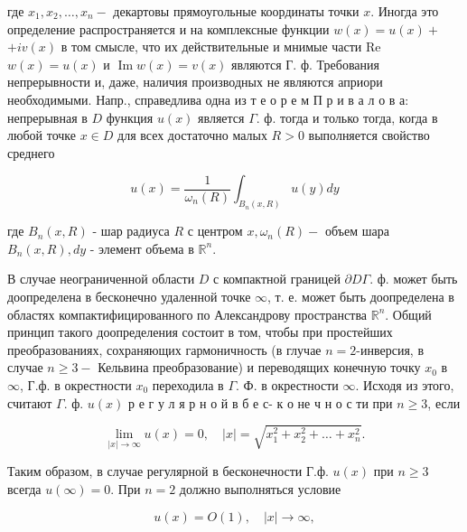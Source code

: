 \documentclass[10pt]{article}
\begin{document}
где $x_{1}, x_{2}, \ldots, x_{n}-$ декартовы прямоугольные координаты точки $x$. Иногда это определение распространяется и на комплексные функции $w(x)=u(x)+$ $+i v(x)$ в том смысле, что их действительные и мнимые части Re $w(x)=u(x)$ и $\operatorname{Im} w(x)=v(x)$ являются Г. ф. Требования непрерывности и, даже, наличия производных не являются априори необходимыми. Напр., справедлива одна из т е о р е м П р и в а л о в а: непрерывная в $D$ функция $u(x)$ является $\Gamma$. ф. тогда и только тогда, когда в любой точке $x \in D$ для всех достаточно малых $R>0$ выполняется свойство среднего



\[

u(x)=\frac{1}{\omega_{n}(R)} \int_{B_{n}(x, R)} u(y) d y

\]



где $B_{n}(x, R)$ - шар радиуса $R$ с центром $x, \omega_{n}(R)-$ объем шара $B_{n}(x, R), d y$ - элемент объема в $\mathbb{R}^{n}$.



В случае неограниченной области $D$ с компактной границей $\partial D \Gamma$. ф. может быть доопределена в бесконечно удаленной точке $\infty$, т. е. может быть доопределена в областях компактифицированного по Александрову пространства $\mathbb{R}^{n}$. Общий принцип такого доопределения состоит в том, чтобы при простейших преобразованиях, сохраняющих гармоничность (в глучае $n=2$-инверсия, в случае $n \geqslant 3-$ Кельвина преобразование) и переводящих конечную точку $x_{0}$ в $\infty$, Г.ф. в окрестности $x_{0}$ переходила в $\Gamma$. Ф. в окрестности $\infty$. Исходя из этого, считают $\Gamma$. ф. $u(x)$ р е г у л я р н о й в б е с- к о не ч н о с ти при $n \geqslant 3$, если



\[

\lim _{|x| \rightarrow \infty} u(x)=0, \quad|x|=\sqrt{x_{1}^{2}+x_{2}^{2}+\ldots+x_{n}^{2}} .

\]



Таким образом, в случае регулярной в бесконечности Г.ф. $u(x)$ при $n \geqslant 3$ всегда $u(\infty)=0$. При $n=2$ должно выполняться условие



\[

u(x)=O(1), \quad|x| \longrightarrow \infty,

\]
\end{document}
